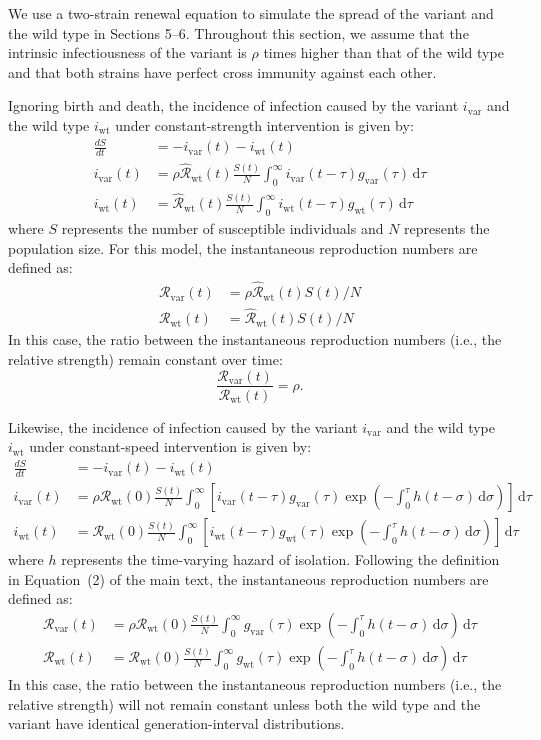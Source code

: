 \documentclass[12pt]{article}
\newcommand{\vvvar}{\mathrm{var}}
\newcommand{\wwwt}{\mathrm{wt}}
\newcommand{\Rx}[1]{\ensuremath{{\mathcal R}_{#1}}\xspace}
\newcommand{\RR}{\ensuremath{{\mathcal R}}\xspace}
\newcommand{\Rw}{\Rx{\wwwt}}
\newcommand{\Rv}{\Rx{\vvvar}}
\newcommand{\hRw}{\hat{\RR}_{\wwwt}}
\newcommand{\dd}[1]{\ensuremath{\, \mathrm{d}#1}}
\newcommand{\dtau}{\dd{\tau}}
\newcommand{\dsigma}{\dd{\sigma}}
\newcommand{\ix}[1]{\ensuremath{{i}_{#1}}\xspace}
\newcommand{\iw}{\ix{\wwwt}}
\newcommand{\iv}{\ix{\vvvar}}
\begin{document}
We use a two-strain renewal equation to simulate the spread of the variant and the wild type in Sections 5--6.
Throughout this section, we assume that the intrinsic infectiousness of the variant is $\rho$ times higher than that of the wild type and that both strains have perfect cross immunity against each other.

Ignoring birth and death, the incidence of infection caused by the variant $\iv$ and the wild type $\iw$ under constant-strength intervention is given by:
\begin{align}
\frac{dS}{dt} &= - \iv(t) - \iw(t)\\
\iv(t) &= \rho  \hRw(t) \frac{S(t)}{N} \int_{0}^\infty \iv(t-\tau) g_{\mathrm{var}}(\tau) \dtau\\
\iw(t) &= \hRw(t) \frac{S(t)}{N}  \int_{0}^\infty \iw(t-\tau) g_{\mathrm{wt}}(\tau) \dtau
\end{align}
where $S$ represents the number of susceptible individuals and $N$ represents the population size.
For this model, the instantaneous reproduction numbers are defined as:
\begin{align}
\Rv(t) &= \rho  \hRw(t)S(t)/N\\
\Rw(t) &=\hRw(t) S(t) /N
\end{align}
In this case, the ratio between the instantaneous reproduction numbers (i.e., the relative strength) remain constant over time:
\begin{equation}
\frac{\Rv(t)}{\Rw(t)} = \rho.
\end{equation}

Likewise, the incidence of infection caused by the variant $\iv$ and the wild type $\iw$ under constant-speed intervention is given by:
\begin{align}
\frac{dS}{dt} &= - \iv(t) - \iw(t)\\
\iv(t) &= \rho  \Rw(0) \frac{S(t)}{N} \int_{0}^\infty \left[\iv(t-\tau) g_{\mathrm{var}}(\tau) \exp \left(- \int_0^\tau h(t-\sigma) \dsigma \right)\right] \dtau\\
\iw(t) &= \Rw(0) \frac{S(t)}{N} \int_{0}^\infty \left[\iw(t-\tau) g_{\mathrm{wt}}(\tau) \exp \left(- \int_0^\tau h(t-\sigma) \dsigma \right)\right] \dtau
\end{align}
where $h$ represents the time-varying hazard of isolation.
Following the definition in Equation~(2) of the main text, the instantaneous reproduction numbers are defined as:
\begin{align}
\Rv(t) &= \rho \Rw(0)  \frac{S(t)}{N} \int_{0}^\infty g_{\mathrm{var}}(\tau) \exp \left(- \int_0^\tau h(t-\sigma) \dsigma \right) \dtau \\
\Rw(t) &= \Rw(0)  \frac{S(t)}{N} \int_{0}^\infty g_{\mathrm{wt}}(\tau) \exp \left(- \int_0^\tau h(t-\sigma) \dsigma \right) \dtau
\end{align}
In this case, the ratio between the instantaneous reproduction numbers (i.e., the relative strength) will not remain constant unless both the wild type and the variant have identical generation-interval distributions.
\end{document}
